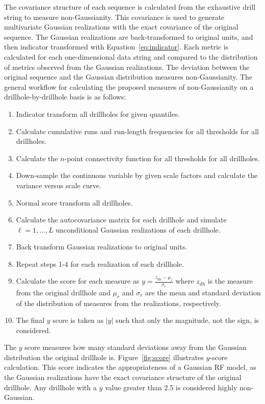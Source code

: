 The covariance structure of each sequence is calculated from the exhaustive drill string to measure non-Gaussianity. This covariance is used to generate multivariate Gaussian realizations with the exact covariance of the original sequence. The Gaussian realizations are back-transformed to original units, and then indicator transformed with Equation~\ref{eq:indicator}. Each metric is calculated for each one-dimensional data string and compared to the distribution of metrics observed from the Gaussian realizations. The deviation between the original sequence and the Gaussian distribution measures non-Gaussianity. The general workflow for calculating the proposed measures of non-Gaussianity on a drillhole-by-drillhole basis is as follows:
\begin{enumerate}[noitemsep]
    \item Indicator transform all drillholes for given quantiles.
    \item Calculate cumulative runs and run-length frequencies for all thresholds for all drillholes.
    \item Calculate the $n$-point connectivity function for all thresholds for all drillholes.
    \item Down-sample the continuous variable by given scale factors and calculate the variance versus scale curve.
    \item Normal score transform all drillholes.
    \item Calculate the autocovariance matrix for each drillhole and simulate $\ell=1,\dots,L$ unconditional Gaussian realizations of each drillhole.
    \item Back transform Gaussian realizations to original units.
    \item Repeat steps 1-4 for each realization of each drillhole.
    \item Calculate the score for each measure as $y = \frac{z_{dh}-\mu_{r}}{\sigma_{r}}$ where $z_{dh}$ is the measure from the original drillhole and $\mu_{r}$ and $\sigma_{r}$ are the mean and standard deviation of the distribution of measures from the realizations, respectively.
    \item The final $y$ score is taken as $\lvert y \rvert$ such that only the magnitude, not the sign, is considered.
\end{enumerate}

The $y$ score measures how many standard deviations away from the Gaussian distribution the original drillhole is. Figure~\ref{fig:score} illustrates $y$-score calculation. This score indicates the appropriateness of a Gaussian \gls{RF} model, as the Gaussian realizations have the exact covariance structure of the original drillhole. Any drillhole with a $y$ value greater than 2.5 is considered highly non-Gaussian.

